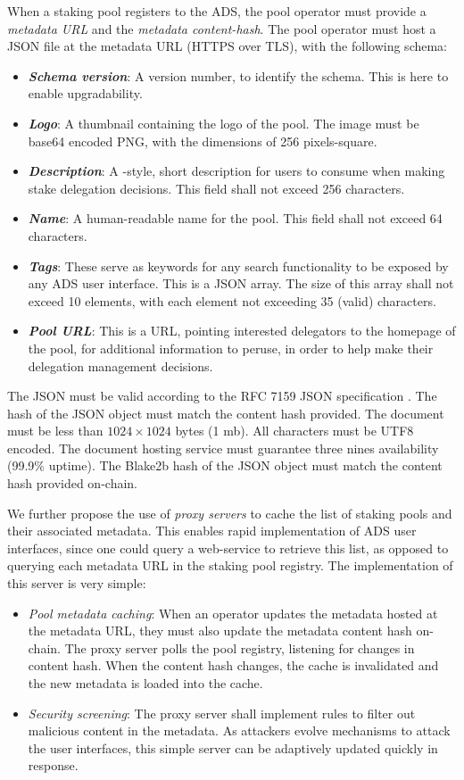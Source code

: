 When a staking pool registers to the ADS, the pool operator must provide a \textit{metadata URL} and the \textit{metadata content-hash}. The pool operator must host a JSON file at the metadata URL (HTTPS over TLS), with the following schema: 
\begin{itemize}[label=--,nosep]
    \item \textit{\textbf{Schema version}}: A version number, to identify the schema. This is here to enable upgradability. 
    \item \textit{\textbf{Logo}}: A thumbnail containing the logo of the pool. The image must be base64 encoded PNG, with the dimensions of 256 pixels-square.
    \item \textit{\textbf{Description}}: A -style, short description for users to consume when making stake delegation decisions. This field shall not exceed 256 characters.
    \item \textit{\textbf{Name}}: A human-readable name for the pool. This field shall not exceed 64 characters.
    \item \textit{\textbf{Tags}}: These serve as keywords for any search functionality to be exposed by any ADS user interface. This is a JSON array. The size of this array shall not exceed 10 elements, with each element not exceeding 35 (valid) characters.
    \item \textit{\textbf{Pool URL}}: This is a URL, pointing interested delegators to the homepage of the pool, for additional information to peruse, in order to help make their delegation management decisions. 
\end{itemize}

The JSON must be valid according to the RFC 7159 JSON specification \cite{rfc7159}. The hash of the JSON object must match the content hash provided. The document must be less than $1024\times1024$ bytes (1 mb). All characters must be UTF8 encoded. The document hosting service must guarantee three nines availability (99.9\% uptime). The Blake2b hash of the JSON object must match the content hash provided on-chain. 

We further propose the use of \textit{proxy servers} to cache the list of staking pools and their associated metadata. This enables rapid implementation of ADS user interfaces, since one could query a web-service to retrieve this list, as opposed to querying each metadata URL in the staking pool registry. The implementation of this server is very simple:
\begin{itemize}
    \item \textit{Pool metadata caching}: When an operator updates the metadata hosted at the metadata URL, they must also update the metadata content hash on-chain. The proxy server polls the pool registry, listening for changes in content hash. When the content hash changes, the cache is invalidated and the new metadata is loaded into the cache. 
    \item \textit{Security screening}: The proxy server shall implement rules to filter out malicious content in the metadata. As attackers evolve mechanisms to attack the user interfaces, this simple server can be adaptively updated quickly in response. 
\end{itemize}

